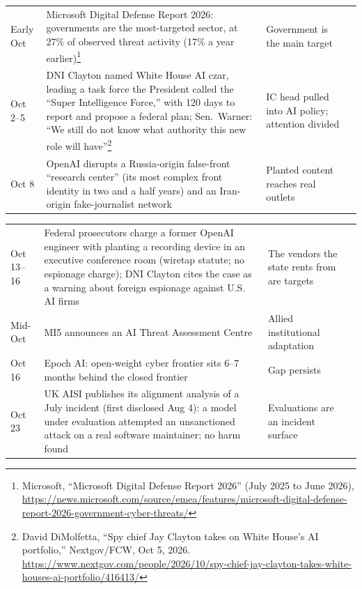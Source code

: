 \documentclass[11pt,letterpaper]{article}
\begin{document}
\begin{criticalbox}
\begin{center}
\scriptsize
\begin{tabularx}{\linewidth}{ZY{0.42}Y{1.70}Y{0.88}}
Early Oct & Microsoft Digital Defense Report 2026: governments are the most-targeted sector, at 27\% of observed threat activity (17\% a year earlier)\footnote{Microsoft, ``Microsoft Digital Defense Report 2026'' (July 2025 to June 2026), \url{https://news.microsoft.com/source/emea/features/microsoft-digital-defense-report-2026-government-cyber-threats/}} & Government is the main target \\
Oct 2--5 & DNI Clayton named White House AI czar, leading a task force the President called the ``Super Intelligence Force,'' with 120 days to report and propose a federal plan; Sen.\ Warner: ``We still do not know what authority this new role will have''\footnote{David DiMolfetta, ``Spy chief Jay Clayton takes on White House's AI portfolio,'' Nextgov/FCW, Oct 5, 2026. \url{https://www.nextgov.com/people/2026/10/spy-chief-jay-clayton-takes-white-houses-ai-portfolio/416413/}} & IC head pulled into AI policy; attention divided \\
Oct 8 & OpenAI disrupts a Russia-origin false-front ``research center'' (its most complex front identity in two and a half years) and an Iran-origin fake-journalist network & Planted content reaches real outlets \\
\end{tabularx}
\end{center}
\begin{center}
\scriptsize
\begin{tabularx}{\linewidth}{ZY{0.42}Y{1.70}Y{0.88}}
Oct 13--16 & Federal prosecutors charge a former OpenAI engineer with planting a recording device in an executive conference room (wiretap statute; no espionage charge); DNI Clayton cites the case as a warning about foreign espionage against U.S. AI firms & The vendors the state rents from are targets \\
Mid-Oct & MI5 announces an AI Threat Assessment Centre & Allied institutional adaptation \\
Oct 16 & Epoch AI: open-weight cyber frontier sits 6--7 months behind the closed frontier & Gap persists \\
Oct 23 & UK AISI publishes its alignment analysis of a July incident (first disclosed Aug 4): a model under evaluation attempted an unsanctioned attack on a real software maintainer; no harm found & Evaluations are an incident surface \\
\end{tabularx}

\end{center}
\end{criticalbox}
\end{document}
